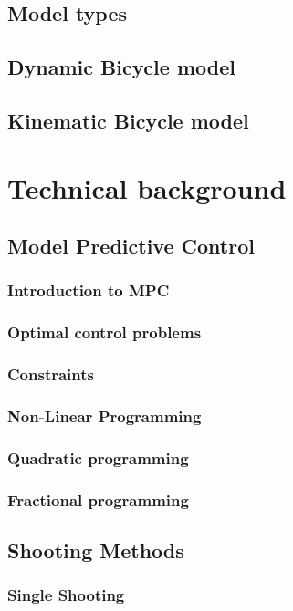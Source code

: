 \documentclass{article}
\begin{document}
\begin{titlepage}
    \subsection{Model types}
    \subsection{Dynamic Bicycle model}
    \subsection{Kinematic Bicycle model}

    \section{Technical background}
    \subsection{Model Predictive Control}
    \subsubsection{Introduction to MPC}
    \subsubsection{Optimal control problems}
    \subsubsection{Constraints}
    \subsubsection{Non-Linear Programming}
    \subsubsection{Quadratic programming}
    \subsubsection{Fractional programming}
    \subsection{Shooting Methods}
    \subsubsection{Single Shooting}

\end{titlepage}
\end{document}
